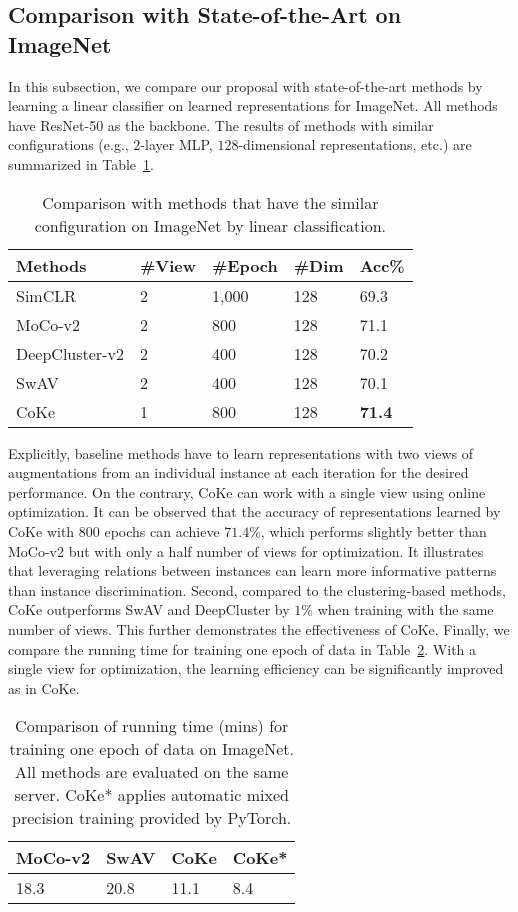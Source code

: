 \documentclass[10pt,twocolumn,letterpaper]{article}
\begin{document}
\subsection{Comparison with State-of-the-Art on ImageNet}
In this subsection, we compare our proposal with state-of-the-art methods by learning a linear classifier on learned representations for ImageNet. All methods have ResNet-50 as the backbone. The results of methods with similar configurations (e.g., $2$-layer MLP, $128$-dimensional representations, etc.) are summarized in Table~\ref{ta:sota1}. 

\begin{table}[!ht]
\centering
\begin{tabular}{|l|l|l|l|l|}\hline
Methods&\#View&\#Epoch&\#Dim&Acc\%\\\hline
SimCLR&2&1,000&128& 69.3\\
MoCo-v2&2&800&128&71.1\\
DeepCluster-v2&2&400&128&70.2\\
SwAV&2&400&128&70.1\\\hline
CoKe&1&800&128&\textbf{71.4}\\\hline
\end{tabular}
\caption{Comparison with methods that have the similar configuration on ImageNet by linear classification.}\label{ta:sota1}
\end{table}

Explicitly, baseline methods have to learn representations with two views of augmentations from an individual instance at each iteration for the desired performance. On the contrary, CoKe can work with a single view using online optimization. It can be observed that the accuracy of representations learned by CoKe with $800$ epochs can achieve $71.4\%$, which performs slightly better than MoCo-v2 but with only a half number of views for optimization. It illustrates that leveraging relations between instances can learn more informative patterns than instance discrimination. Second, compared to the clustering-based methods, CoKe outperforms SwAV and DeepCluster by $1\%$ when training with the same number of views. This further demonstrates the effectiveness of CoKe. Finally, we compare the running time for training one epoch of data in Table~\ref{ta:time}. With a single view for optimization, the learning efficiency can be significantly improved as in CoKe. 

\begin{table}[!ht]
\centering
\begin{tabular}{|l|l|l|l|}\hline
MoCo-v2&SwAV&CoKe&CoKe*\\\hline
18.3&20.8& 11.1 &8.4 \\\hline
\end{tabular}
\caption{Comparison of running time (mins) for training one epoch of data on ImageNet. All methods are evaluated on the same server. CoKe* applies automatic mixed precision training provided by PyTorch.}\label{ta:time}
\end{table}
\end{document}
